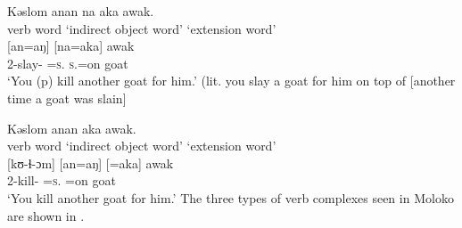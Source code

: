 \ea\label{ex:7:9}
Kəslom  anan  na  aka  awak.\\
verb word   \hspace{10pt}        ‘indirect object word’   \hspace{10pt}    ‘extension word’\\
\gll  [kʊ-ɬ-ɔm] \hspace{15pt}   [an=aŋ] \hspace{60pt}   [na=aka] \hspace{30pt}   awak\\
2-slay-{\twoP} \hspace{15pt} {\DAT}=\textsc{s}.{\IO} \hspace{60pt}   \textsc{s}.{\DO}=on \hspace{30pt}   goat\\
\glt ‘You (p) kill another goat for him.’ (lit. you slay a goat for him on top of [another time a goat was slain]
\z

\ea\label{ex:7:10}
 Kəslom  anan  aka  awak.\\
verb word    \hspace{10pt}             ‘indirect object word’ \hspace{10pt} ‘extension word’\\
\gll {}[kʊ-ɬ-ɔm] \hspace{15pt} [an=aŋ] \hspace{60pt} [=aka] \hspace{50pt}   awak\\
2-kill-{\twoP} \hspace{15pt} {\DAT}=\textsc{s}.{\IO} \hspace{60pt} =on \hspace{50pt}   goat\\
\glt ‘You kill another goat for him.’
\z
The three types of verb complexes seen in Moloko are shown in .

